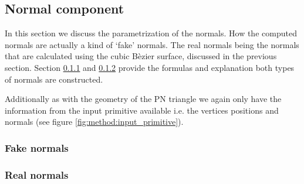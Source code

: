 
\subsection{Normal component}\label{ss:normal_component}
In this section we discuss the parametrization of the normals. How the computed normals are actually a kind of `fake' normals. The real normals being the normals that are calculated using the cubic B\`ezier surface, discussed in the previous section. Section \ref{sss:method:normals:fakeNormals} and \ref{sss:method:normals:realNormals} provide the formulas and explanation both types of normals are constructed.

Additionally as with the geometry of the PN triangle we again only have the information from the input primitive available i.e. the vertices positions and normals (see figure \ref{fig:method:input_primitive}).



\subsubsection{Fake normals}
\label{sss:method:normals:fakeNormals}

\subsubsection{Real normals}
\label{sss:method:normals:realNormals}
